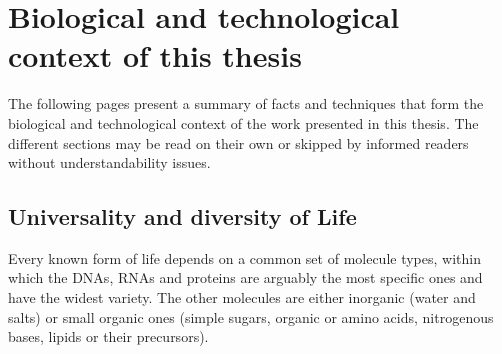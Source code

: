 \chapter{Biological and technological context of this thesis}%
\label{ch:background}

\setlength{\epigraphwidth}{0.9\textwidth}
\setlength{\epigraphrule}{0pt}

The following pages present a summary of facts and techniques
that form the biological and technological context
of the work presented in this thesis.
The different sections may be read on their own
or skipped by informed readers without understandability issues.

\begin{comment}
\Rough{%
expected and reported correlation between transcripts and proteins
Measuring protein expression by MS, data analysis – spectral counts, top 3, etc,
available large scale datasets on human tissues
The problem of comparing and integrating independent datasets, EBI’s GXA \\ \\
key concepts: DNA storage, RNA transfert of information and regulation,
protein effectors ==\textgreater phenotype.\\ \\
%
Do not forget the (tissues) specifications and the structural functions. =\textgreater Embryology.\\ \\
}
\end{comment}

\vspace{-1mm}
\section{Universality and diversity of Life}\label{sec:bio}
\vspace{-1mm}

Every known form of life depends on a common set of molecule types,
within which the \glspl{DNA}, \glspl{RNA} and proteins
are arguably the most specific ones and have the widest variety.
The other molecules are either inorganic (water and salts)
or small organic ones (simple sugars, organic or amino acids,
nitrogenous bases, lipids or their precursors).~

